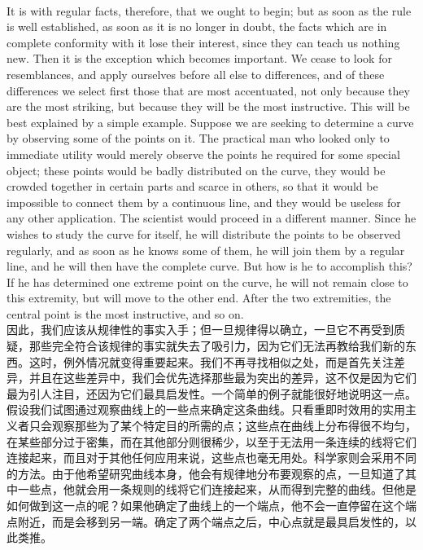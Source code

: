 \documentclass{article}
\begin{document}
\\
It is with regular facts, therefore, that we ought to begin; but as soon as the rule is well established, as soon as it is no longer in doubt, the facts which are in complete conformity with it lose their interest, since they can teach us nothing new. Then it is the exception which becomes important. We cease to look for resemblances, and apply ourselves before all else to differences, and of these differences we select first those that are most accentuated, not only because they are the most striking, but because they will be the most instructive. This will be best explained by a simple example. Suppose we are seeking to determine a curve by observing some of the points on it. The practical man who looked only to immediate utility would merely observe the points he required for some special object; these points would be badly distributed on the curve, they would be crowded together in certain parts and scarce in others, so that it would be impossible to connect them by a continuous line, and they would be useless for any other application. The scientist would proceed in a different manner. Since he wishes to study the curve for itself, he will distribute the points to be observed regularly, and as soon as he knows some of them, he will join them by a regular line, and he will then have the complete curve. But how is he to accomplish this? If he has determined one extreme point on the curve, he will not remain close to this extremity, but will move to the other end. After the two extremities, the central point is the most instructive, and so on.\\
因此，我们应该从规律性的事实入手；但一旦规律得以确立，一旦它不再受到质疑，那些完全符合该规律的事实就失去了吸引力，因为它们无法再教给我们新的东西。这时，例外情况就变得重要起来。我们不再寻找相似之处，而是首先关注差异，并且在这些差异中，我们会优先选择那些最为突出的差异，这不仅是因为它们最为引人注目，还因为它们最具启发性。一个简单的例子就能很好地说明这一点。假设我们试图通过观察曲线上的一些点来确定这条曲线。只看重即时效用的实用主义者只会观察那些为了某个特定目的所需的点；这些点在曲线上分布得很不均匀，在某些部分过于密集，而在其他部分则很稀少，以至于无法用一条连续的线将它们连接起来，而且对于其他任何应用来说，这些点也毫无用处。科学家则会采用不同的方法。由于他希望研究曲线本身，他会有规律地分布要观察的点，一旦知道了其中一些点，他就会用一条规则的线将它们连接起来，从而得到完整的曲线。但他是如何做到这一点的呢？如果他确定了曲线上的一个端点，他不会一直停留在这个端点附近，而是会移到另一端。确定了两个端点之后，中心点就是最具启发性的，以此类推。 \\
\end{document}
